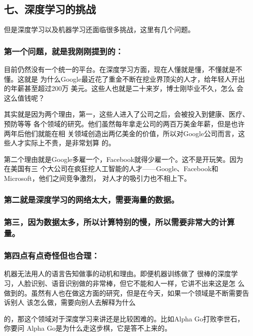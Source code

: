 \documentclass[11pt]{ctexart}
\begin{document}
{{{{\subsection{七、深度学习的挑战}
\label{sec:org03d8de3}

但是深度学习以及机器学习还面临很多挑战，这里有几个问题。

\subsubsection{第一个问题，就是我刚刚提到的：}
\label{sec:orgc2d64e5}
目前仍然没有一个统一的平台。在深度学习方面，现在人懂就是懂，不懂就是不懂。这就是
为什么Google最近花了重金不断在挖业界顶尖的人才，给年轻人开出的年薪甚至超过200万
美元。这些人也就是二十来岁，博士刚毕业不久，怎么
会这么值钱呢？


其实就是因为两个理由，第一，这些人进入了公司之后，会被投入到健康、医疗、预防等等
各个领域的研究。他们虽然每年拿走公司的两百万美金年薪，但是也许两年后他们就能在相
关领域创造出两亿美金的价值，所以对Google公司而言，这些人才实际上不贵，是非常划算
的。

第二个理由就是Google多雇一个，Facebook就得少雇一个。这不是开玩笑。因为在美国有三
个大公司在疯狂挖人工智能的人才——Google、Facebook和Microsoft，他们之间竞争激烈，
对人才的吸引力也不相上下。

\subsubsection{第二就是深度学习的网络太大，需要海量的数据。}
\label{sec:org762085d}

\subsubsection{第三，因为数据太多，所以计算特别的慢，所以需要非常大的计算量。}
\label{sec:org22b5aeb}

\subsubsection{第四点有点奇怪但也合理：}
\label{sec:orgb2f4c6e}
机器无法用人的语言告知做事的动机和理由。即便机器训练做了
很棒的深度学习，人脸识别、语音识别做的非常棒，但它不能和人一样，它讲不出来这是怎
么做到的。虽然有人也在做这方面的研究，但是在今天，如果一个领域是不断需要告诉别人
该怎么做，需要向别人去解释为什么

的，那这个领域对于深度学习来讲还是比较困难的。比如Alpha Go打败李世石，你要问
Alpha Go是为什么走这步棋，它是答不上来的。

}}}}
\end{document}
